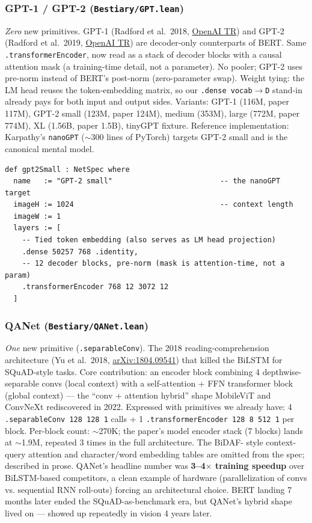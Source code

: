 \subsubsection*{GPT-1 / GPT-2 (\texttt{Bestiary/GPT.lean})}
\emph{Zero} new primitives. GPT-1 (Radford et al.\ 2018,
\href{https://cdn.openai.com/research-covers/language-unsupervised/language_understanding_paper.pdf}{OpenAI TR})
and GPT-2 (Radford et al.\ 2019,
\href{https://cdn.openai.com/better-language-models/language_models_are_unsupervised_multitask_learners.pdf}{OpenAI TR})
are decoder-only counterparts of BERT. Same
\texttt{.transformerEncoder}, now read as a stack of decoder blocks
with a causal attention mask (a training-time detail, not a
parameter). No pooler; GPT-2 uses pre-norm instead of BERT's
post-norm (zero-parameter swap). Weight tying: the LM head reuses
the token-embedding matrix, so our \texttt{.dense vocab$\to$D}
stand-in already pays for both input and output sides. Variants:
GPT-1 (116M, paper 117M), GPT-2 small (123M, paper 124M), medium
(353M), large (772M, paper 774M), XL (1.56B, paper 1.5B), tinyGPT
fixture. Reference implementation: Karpathy's \texttt{nanoGPT}
($\sim$300 lines of PyTorch) targets GPT-2 small and is the
canonical mental model.

\begin{verbatim}
def gpt2Small : NetSpec where
  name   := "GPT-2 small"                         -- the nanoGPT target
  imageH := 1024                                  -- context length
  imageW := 1
  layers := [
    -- Tied token embedding (also serves as LM head projection)
    .dense 50257 768 .identity,
    -- 12 decoder blocks, pre-norm (mask is attention-time, not a param)
    .transformerEncoder 768 12 3072 12
  ]
\end{verbatim}

\subsubsection*{QANet (\texttt{Bestiary/QANet.lean})}
\emph{One} new primitive (\texttt{.separableConv}). The 2018 reading-comprehension
architecture (Yu et al.\ 2018,
\href{https://arxiv.org/abs/1804.09541}{arXiv:1804.09541}) that killed
the BiLSTM for SQuAD-style
tasks. Core contribution: an encoder block combining 4 depthwise-
separable convs (local context) with a self-attention + FFN
transformer block (global context) --- the ``conv + attention
hybrid'' shape MobileViT and ConvNeXt rediscovered in 2022.
Expressed with primitives we already have: 4
\texttt{.separableConv 128 128 1} calls + 1
\texttt{.transformerEncoder 128 8 512 1} per block. Per-block count:
$\sim$270K; the paper's model encoder stack (7 blocks) lands at
$\sim$1.9M, repeated 3 times in the full architecture. The BiDAF-
style context-query attention and character/word embedding tables
are omitted from the spec; described in prose. QANet's headline
number was \textbf{3--4$\times$ training speedup} over BiLSTM-based
competitors, a clean example of hardware (parallelization of convs
vs. sequential RNN roll-outs) forcing an architectural choice.
BERT landing 7 months later ended the SQuAD-as-benchmark era, but
QANet's hybrid shape lived on --- showed up repeatedly in vision
4 years later.

